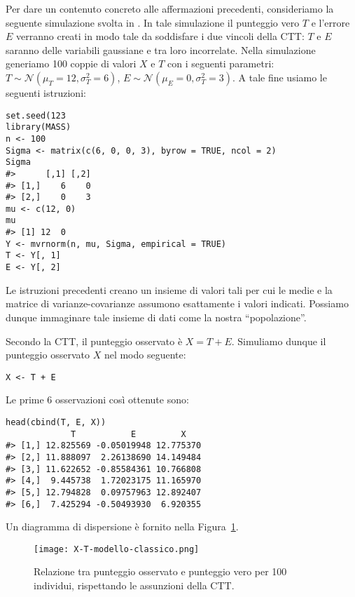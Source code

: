 Per dare un contenuto concreto alle affermazioni precedenti, consideriamo la seguente  simulazione svolta in \R.
In tale simulazione il punteggio vero $T$ e l'errore $E$ verranno creati in modo tale da soddisfare i due vincoli della CTT: $T$ e $E$ saranno delle variabili gaussiane e tra loro incorrelate. 
Nella simulazione generiamo 100 coppie di valori $X$ e $T$ con i seguenti parametri: $T \sim \mathcal{N}(\mu_T = 12, \sigma^2_T = 6)$, $E \sim \mathcal{N}(\mu_E = 0, \sigma^2_T = 3)$. 
A tale fine usiamo le seguenti istruzioni:
\begin{lstlisting}
set.seed(123
library(MASS)
n <- 100
Sigma <- matrix(c(6, 0, 0, 3), byrow = TRUE, ncol = 2)
Sigma
#>      [,1] [,2]
#> [1,]    6    0
#> [2,]    0    3
mu <- c(12, 0)
mu
#> [1] 12  0
Y <- mvrnorm(n, mu, Sigma, empirical = TRUE)
T <- Y[, 1]
E <- Y[, 2]
\end{lstlisting}
Le istruzioni precedenti creano un insieme di valori tali per cui le medie e la matrice di varianze-covarianze assumono esattamente i valori indicati.
Possiamo dunque immaginare tale insieme di dati come la nostra \enquote{popolazione}. 

Secondo la CTT, il punteggio osservato è $X = T + E$. 
Simuliamo dunque il punteggio osservato $X$ nel modo seguente:
\begin{lstlisting}
X <- T + E
\end{lstlisting}
Le prime 6 osservazioni così ottenute sono:
\begin{lstlisting}
head(cbind(T, E, X))
             T           E         X
#> [1,] 12.825569 -0.05019948 12.775370
#> [2,] 11.888097  2.26138690 14.149484
#> [3,] 11.622652 -0.85584361 10.766808
#> [4,]  9.445738  1.72023175 11.165970
#> [5,] 12.794828  0.09757963 12.892407
#> [6,]  7.425294 -0.50493930  6.920355
\end{lstlisting}
Un diagramma di dispersione è fornito nella Figura~\ref{fig:tct_regressione}.
\begin{figure}
\centering
\texttt{[image: X-T-modello-classico.png]}
\caption{Relazione tra punteggio osservato e punteggio vero per 100 individui, rispettando le assunzioni della CTT.}
\label{fig:tct_regressione}
\end{figure}

